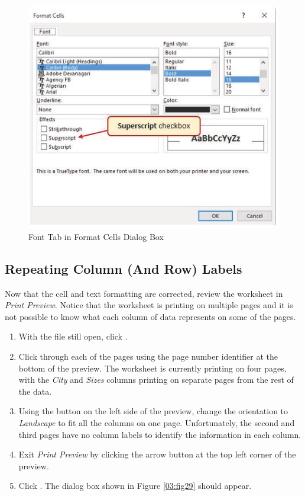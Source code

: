 \begin{figure}[H]
	\centering
	\includegraphics[width=\maxwidth{.95\linewidth}]{gfx/ch03_fig28}
	\caption{Font Tab in Format Cells Dialog Box}
	\label{03:fig28}
\end{figure}

\subsection{Repeating Column (And Row) Labels}

Now that the cell and text formatting are corrected, review the worksheet in \textit{Print Preview}. Notice that the worksheet is printing on multiple pages and it is not possible to know what each column of data represents on some of the pages.

\begin{enumerate}
	\item With the  file still open, click .
	\item Click through each of the pages using the page number identifier at the bottom of the preview. The worksheet is currently printing on four pages, with the \textit{City} and \textit{Sizes} columns printing on separate pages from the rest of the data.
	\item Using the  button on the left side of the preview, change the orientation to \textit{Landscape} to fit all the columns on one page. Unfortunately, the second and third pages have no column labels to identify the information in each column. 
	\item Exit \textit{Print Preview} by clicking the arrow button at the top left corner of the preview.
	\item Click . The dialog box shown in Figure \ref{03:fig29} should appear.
\end{enumerate}

